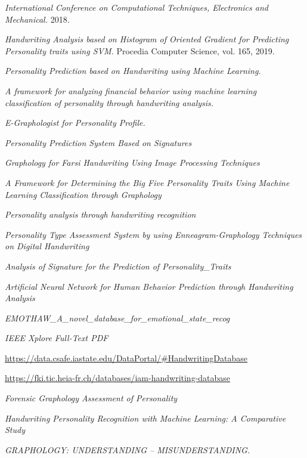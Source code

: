 \documentclass[10pt, a4paper]{article}
\begin{document}
\begin{thebibliography}{99}
         \emph{International Conference on Computational Techniques, Electronics and Mechanical.} 2018. 
    
         \emph{Handwriting Analysis based on Histogram of Oriented Gradient for Predicting Personality traits using SVM.} Procedia Computer Science, vol. 165, 2019.
    
         \emph{Personality Prediction based on Handwriting using Machine Learning.}
        
         \emph{A framework for analyzing financial behavior using machine learning classification of personality through handwriting analysis.}
    
         \emph{E-Graphologist for Personality Profile.}

          \emph{Personality Prediction System Based on Signatures}
        
          \emph{Graphology for Farsi Handwriting Using Image Processing Techniques    }
        
          \emph{A Framework for Determining the Big Five Personality Traits Using Machine Learning Classification through Graphology}
        
          \emph{Personality analysis through handwriting recognition}
        
         \emph{Personality Type Assessment System by using  Enneagram-Graphology Techniques on Digital  Handwriting}
        
         \emph{Analysis of Signature for the Prediction of Personality\_Traits}
        
         \emph{Artificial Neural Network for Human Behavior Prediction  through Handwriting Analysis}
        
         \emph{EMOTHAW\_A\_novel\_database\_for\_emotional\_state\_recog}
        
         \emph{IEEE Xplore Full-Text PDF}
        
         \url{https://data.csafe.iastate.edu/DataPortal/#HandwritingDatabase} 
        
         \url{https://fki.tic.heia-fr.ch/databases/iam-handwriting-database} 

         \emph{Forensic Graphology Assessment of Personality}

         \emph{Handwriting Personality Recognition with Machine  Learning: A Comparative Study}

         \emph{GRAPHOLOGY: UNDERSTANDING – MISUNDERSTANDING.}
    \end{thebibliography}
\end{document}
